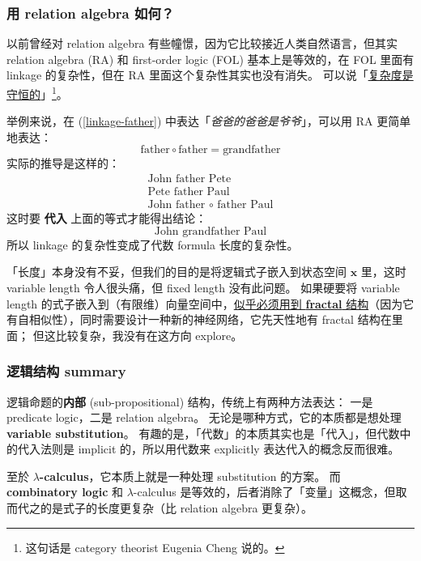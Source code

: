 \documentclass[orivec]{llncs}
\newcommand{\emp}[1]{\textbf{#1}}
\newcommand{\vect}[1]{\boldsymbol{#1}}
\begin{document}
\subsubsection{用 relation algebra 如何？}

以前曾经对 relation algebra \cite{Schmidt2010} \cite{Maddux2006} 有些幢憬，因为它比较接近人类自然语言，但其实 relation algebra (RA) 和 first-order logic (FOL) 基本上是等效的，在 FOL 里面有 linkage 的复杂性，但在 RA 里面这个复杂性其实也没有消失。 可以说「\underline{复杂度是守恒的}」\footnote{这句话是 category theorist Eugenia Cheng 说的。}。

举例来说，在 (\ref{linkage-father}) 中表达「\textit{爸爸的爸爸是爷爷}」，可以用 RA 更简单地表达：
\begin{equation}
 \mbox{father} \circ \mbox{father} = \mbox{grandfather}
\end{equation}
实际的推导是这样的：
\begin{eqnarray}
\mbox{John father Pete} \nonumber \\
\mbox{Pete father Paul} \nonumber \\
\mbox{John father $\circ$ father Paul} 
\end{eqnarray}
这时要 \emp{代入} 上面的等式才能得出结论：
\begin{equation}
\mbox{John grandfather Paul}
\end{equation}
所以 linkage 的复杂性变成了代数 formula 长度的复杂性。 

「长度」本身没有不妥，但我们的目的是将逻辑式子嵌入到状态空间 $\vect{x}$ 里，这时 variable length 令人很头痛，但 fixed length 没有此问题。 如果硬要将 variable length 的式子嵌入到（有限维）向量空间中，\uline{似乎必须用到 \emp{fractal} 结构}（因为它有自相似性），同时需要设计一种新的神经网络，它先天性地有 fractal 结构在里面； 但这比较复杂，我没有在这方向 explore。

\subsubsection{逻辑结构 summary}

逻辑命题的\textbf{内部} (sub-propositional) 结构，传统上有两种方法表达： 一是 predicate logic，二是 relation algebra。 无论是哪种方式，它的本质都是想处理 \emp{variable substitution}。 有趣的是，「代数」的本质其实也是「代入」，但代数中的代入法则是 implicit 的，所以用代数来 explicitly 表达代入的概念反而很难。

至於 \emp{$\lambda$-calculus}，它本质上就是一种处理 substitution 的方案。 而 \emp{combinatory logic} 和 $\lambda$-calculus 是等效的，后者消除了「变量」这概念，但取而代之的是式子的长度更复杂（比 relation algebra 更复杂）。
\end{document}
